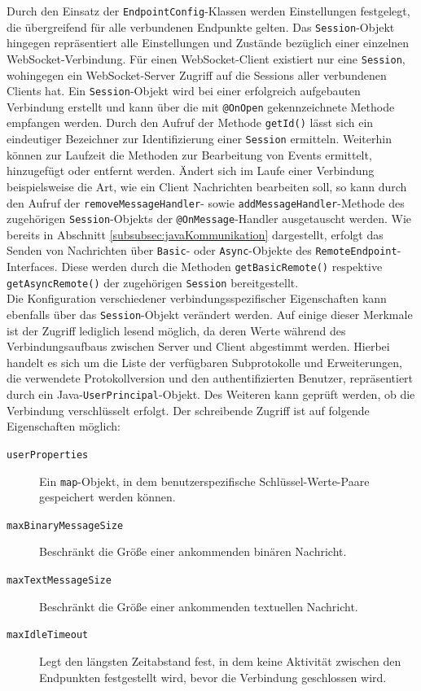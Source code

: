 \documentclass[11pt,a4paper,titlepage]{scrartcl}
\numberwithin{equation}{section}
\begin{document}
\noindent Durch den Einsatz der \texttt{EndpointConfig}-Klassen werden Einstellungen festgelegt, die übergreifend für alle verbundenen Endpunkte gelten. Das \texttt{Session}-Objekt hingegen repräsentiert alle Einstellungen und Zustände bezüglich einer einzelnen WebSocket-Verbindung. Für einen WebSocket-Client existiert nur eine \texttt{Session}, wohingegen ein WebSocket-Server Zugriff auf die Sessions aller verbundenen Clients hat. Ein \texttt{Session}-Objekt wird bei einer erfolgreich aufgebauten Verbindung erstellt und kann über die mit \texttt{@OnOpen} gekennzeichnete Methode empfangen werden. Durch den Aufruf der Methode \texttt{getId()} lässt sich ein eindeutiger Bezeichner zur Identifizierung einer \texttt{Session} ermitteln. Weiterhin können zur Laufzeit die Methoden zur Bearbeitung von Events ermittelt, hinzugefügt oder entfernt werden. Ändert sich im Laufe einer Verbindung beispielsweise die Art, wie ein Client Nachrichten bearbeiten soll, so kann durch den Aufruf der \texttt{removeMessageHandler}- sowie \texttt{addMessageHandler}-Methode des zugehörigen \texttt{Session}-Objekts der \texttt{@OnMessage}-Handler ausgetauscht werden. Wie bereits in Abschnitt \ref{subsubsec:javaKommunikation} dargestellt, erfolgt das Senden von Nachrichten über \texttt{Basic}- oder \texttt{Async}-Objekte des \texttt{RemoteEndpoint}-Interfaces. Diese werden durch die Methoden \texttt{getBasicRemote()} respektive \texttt{getAsyncRemote()} der zugehörigen \texttt{Session} bereitgestellt. \\

\noindent Die Konfiguration verschiedener verbindungsspezifischer Eigenschaften kann ebenfalls über das \texttt{Session}-Objekt verändert werden. Auf einige dieser Merkmale ist der Zugriff lediglich lesend möglich, da deren Werte während des Verbindungsaufbaus zwischen Server und Client abgestimmt werden. Hierbei handelt es sich um die Liste der verfügbaren Subprotokolle und Erweiterungen, die verwendete Protokollversion und den authentifizierten Benutzer, repräsentiert durch ein Java-\texttt{UserPrincipal}-Objekt. Des Weiteren kann geprüft werden, ob die Verbindung verschlüsselt erfolgt. Der schreibende Zugriff ist auf folgende Eigenschaften möglich: 

\begin{description}
	\item[\texttt{userProperties}] Ein \texttt{map}-Objekt, in dem benutzerspezifische Schlüssel-Werte-Paare gespeichert werden können.
	\item[\texttt{maxBinaryMessageSize}] Beschränkt die Größe einer ankommenden binären Nachricht. 
	\item[\texttt{maxTextMessageSize}] Beschränkt die Größe einer ankommenden textuellen Nachricht. 
	\item[\texttt{maxIdleTimeout}] Legt den längsten Zeitabstand fest, in dem keine Aktivität zwischen den Endpunkten festgestellt wird, bevor die Verbindung geschlossen wird.
\end{description}
\end{document}
